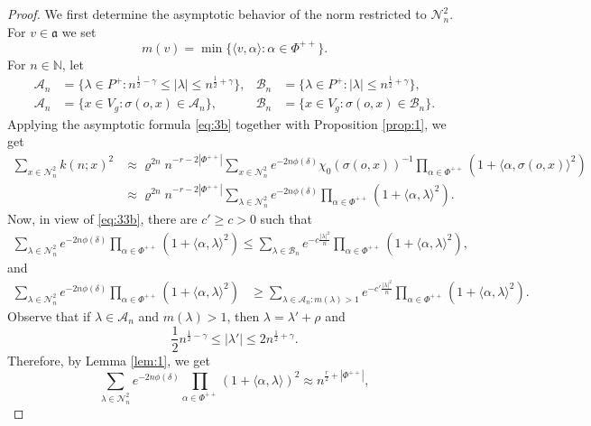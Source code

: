 \documentclass[10pt,a4paper]{amsart}
\newcommand{\NN}{\mathbb{N}}
\newcommand{\calA}{\mathcal{A}}
\newcommand{\calB}{\mathcal{B}}
\newcommand{\calN}{\mathcal{N}}
\newcommand{\scrA}{\mathscr{A}}
\newcommand{\scrB}{\mathscr{B}}
\newcommand{\scrN}{\mathscr{N}}
\newcommand{\sprod}[2]{\langle {#1}, {#2} \rangle}
\begin{document}
\begin{proof} 
	We first determine the asymptotic behavior of the norm restricted to $\calN_n^2$. For $v \in \mathfrak{a}$ we set
	\[
		m(v) = \min \big\{\sprod{v}{\alpha} : \alpha  \in \Phi^{++}\big\}.
	\]
	For $n \in \NN$, let
	\begin{align*}
		\calA_n &= \Big\{\lambda \in P^+ : n^{\frac{1}{2}-\gamma} \leqslant |\lambda| \leqslant n^{\frac12+\gamma} \Big\},
		&\calB_n &= \Big\{\lambda \in P^+: |\lambda| \leqslant n^{\frac12+\gamma} \Big\}, \\
		\scrA_n &= \{x \in V_g : \sigma(o, x) \in \calA_n\}, 
		&\scrB_n &= \{x \in V_g : \sigma(o, x) \in \calB_n\}. 
	\end{align*}
	Applying the asymptotic formula \eqref{eq:3b} together with Proposition \ref{prop:1}, we get
	\begin{align*}
		\sum_{x \in \scrN_n^2} k(n; x)^2 
		&\approx
		\varrho^{2n} n^{-r - 2 |\Phi^{++}|} 
		\sum_{x \in \scrN_n^2} e^{- 2 n \phi(\delta)} \chi_0(\sigma(o, x))^{-1} 
		\prod_{\alpha \in \Phi^{++}} (1 + \sprod{\alpha}{\sigma(o, x)}^2)  \\
		&\approx
		\varrho^{2n} n^{-r - 2 |\Phi^{++}|} 
		\sum_{\lambda \in \calN_n^2} 
		e^{-2 n \phi(\delta)} \prod_{\alpha \in \Phi^{++}} (1 + \sprod{\alpha}{\lambda}^2).
	\end{align*}
	Now, in view of \eqref{eq:33b}, there are $c' \geqslant c > 0$ such that 
	\begin{align*}
		\sum_{\lambda \in \calN_n^2} 
		e^{-2 n \phi(\delta)} \prod_{\alpha \in \Phi^{++}} 
		(1 + \sprod{\alpha}{\lambda}^2)
		\leqslant
		\sum_{\lambda \in \calB_n} e^{-c \frac{|\lambda|^2}{n}}
		\prod_{\alpha \in \Phi^{++}}
		(1 + \sprod{\alpha}{\lambda}^2),
	\end{align*}
	and
	\begin{align*}
		\sum_{\lambda \in \calN_n^2} 
		e^{-2 n \phi(\delta)} \prod_{\alpha \in \Phi^{++}} (1 + \sprod{\alpha}{\lambda}^2)
		&\geqslant
		\sum_{\lambda \in \calA_n : m(\lambda) > 1 } e^{-c' \frac{|\lambda|^2}{n}}
		\prod_{\alpha \in \Phi^{++}}
		(1 + \sprod{\alpha}{\lambda}^2).
	\end{align*}
	Observe that if $\lambda \in \calA_n$ and $m(\lambda) > 1$, then $\lambda = \lambda' + \rho$ and 
	\[
		\frac{1}{2} n^{\frac12-\gamma} \leqslant |\lambda'| \leqslant 2 n^{\frac12+\gamma}.
	\]
	Therefore, by Lemma \ref{lem:1}, we get
	\[
		\sum_{\lambda \in \calN_n^2} 
		e^{-2 n \phi(\delta)} \prod_{\alpha \in \Phi^{++}} (1 + \sprod{\alpha}{\lambda})^2
		\approx
		n^{\frac{r}{2} + |\Phi^{++}|},
\]
\end{proof}
\end{document}
